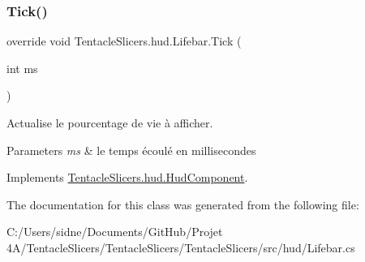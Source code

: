 \subsubsection{\texorpdfstring{Tick()}{Tick()}}
{\footnotesize\ttfamily override void Tentacle\+Slicers.\+hud.\+Lifebar.\+Tick (\begin{DoxyParamCaption}\item[{int}]{ms }\end{DoxyParamCaption})\hspace{0.3cm}{\ttfamily [virtual]}}



Actualise le pourcentage de vie à afficher. 


\begin{DoxyParams}{Parameters}
{\em ms} & le temps écoulé en millisecondes \\
\hline
\end{DoxyParams}


Implements \hyperlink{class_tentacle_slicers_1_1hud_1_1_hud_component}{Tentacle\+Slicers.\+hud.\+Hud\+Component}.



The documentation for this class was generated from the following file\+:\begin{DoxyCompactItemize}
\item 
C\+:/\+Users/sidne/\+Documents/\+Git\+Hub/\+Projet 4\+A/\+Tentacle\+Slicers/\+Tentacle\+Slicers/\+Tentacle\+Slicers/src/hud/Lifebar.\+cs\end{DoxyCompactItemize}

